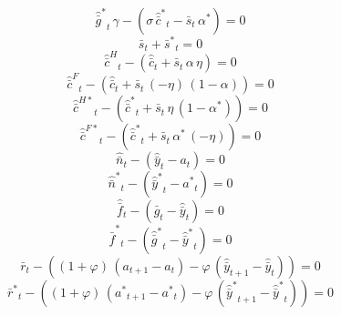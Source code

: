 \begin{dmath}
{{\hat {\bar g}^*}}_{t}\, {{\gamma}}-\left({{\sigma}}\, {{\hat {\bar c}^*}}_{t}-{{\bar s}}_{t}\, {{\alpha^*}}\right)=0
\end{dmath}
\begin{dmath}
{{\bar s}}_{t}+{{\bar s^*}}_{t}=0
\end{dmath}
\begin{dmath}
{{\hat {\bar c}^H}}_{t}-\left({{\hat {\bar c}}}_{t}+{{\bar s}}_{t}\, {{\alpha}}\, {{\eta}}\right)=0
\end{dmath}
\begin{dmath}
{{\hat {\bar c}^F}}_{t}-\left({{\hat {\bar c}}}_{t}+{{\bar s}}_{t}\, \left(-{{\eta}}\right)\, \left(1-{{\alpha}}\right)\right)=0
\end{dmath}
\begin{dmath}
{{\hat {\bar c}^{H*}}}_{t}-\left({{\hat {\bar c}^*}}_{t}+{{\bar s}}_{t}\, {{\eta}}\, \left(1-{{\alpha^*}}\right)\right)=0
\end{dmath}
\begin{dmath}
{{\hat {\bar c}^{F*}}}_{t}-\left({{\hat {\bar c}^*}}_{t}+{{\bar s}}_{t}\, {{\alpha^*}}\, \left(-{{\eta}}\right)\right)=0
\end{dmath}
\begin{dmath}
{{\hat {\bar n}}}_{t}-\left({{\hat {\bar y}}}_{t}-{{a}}_{t}\right)=0
\end{dmath}
\begin{dmath}
{{\hat {\bar n}^*}}_{t}-\left({{\hat {\bar y}^*}}_{t}-{{a^*}}_{t}\right)=0
\end{dmath}
\begin{dmath}
{{\hat {\bar f}}}_{t}-\left({{\hat {\bar g}}}_{t}-{{\hat {\bar y}}}_{t}\right)=0
\end{dmath}
\begin{dmath}
{{\hat {\bar f}^*}}_{t}-\left({{\hat {\bar g}^*}}_{t}-{{\hat {\bar y}^*}}_{t}\right)=0
\end{dmath}
\begin{dmath}
{{\bar r}}_{t}-\left(\left(1+{{\varphi}}\right)\, \left({{a}}_{t+1}-{{a}}_{t}\right)-{{\varphi}}\, \left({{\hat {\bar y}}}_{t+1}-{{\hat {\bar y}}}_{t}\right)\right)=0
\end{dmath}
\begin{dmath}
{{\bar r^*}}_{t}-\left(\left(1+{{\varphi}}\right)\, \left({{a^*}}_{t+1}-{{a^*}}_{t}\right)-{{\varphi}}\, \left({{\hat {\bar y}^*}}_{t+1}-{{\hat {\bar y}^*}}_{t}\right)\right)=0
\end{dmath}
